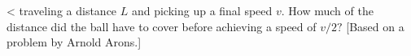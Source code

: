  <%
traveling a distance $L$ and picking up a final speed $v$.
How much of the distance did the ball have to cover before
achieving a speed of $v/2?$ [Based on a problem by Arnold Arons.]
